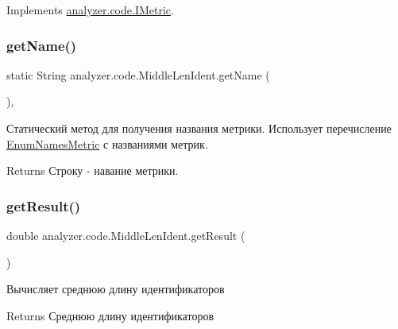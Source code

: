 Implements \hyperlink{interfaceanalyzer_1_1code_1_1IMetric}{analyzer.\+code.\+I\+Metric}.

\mbox{\label{classanalyzer_1_1code_1_1MiddleLenIdent_a4416bc43e60c97f489cccc3e6e9b67b1}} 
\subsubsection{\texorpdfstring{get\+Name()}{getName()}}
{\footnotesize\ttfamily static String analyzer.\+code.\+Middle\+Len\+Ident.\+get\+Name (\begin{DoxyParamCaption}{ }\end{DoxyParamCaption})\hspace{0.3cm}{\ttfamily [inline]}, {\ttfamily [static]}}

Статический метод для получения названия метрики. Использует перечисление \hyperlink{enumanalyzer_1_1code_1_1EnumNamesMetric}{Enum\+Names\+Metric} с названиями метрик. \begin{DoxyReturn}{Returns}
Строку -\/ навание метрики. 
\end{DoxyReturn}
\mbox{\label{classanalyzer_1_1code_1_1MiddleLenIdent_a46411e2d526efa424d894a7b5c950625}} 
\subsubsection{\texorpdfstring{get\+Result()}{getResult()}}
{\footnotesize\ttfamily double analyzer.\+code.\+Middle\+Len\+Ident.\+get\+Result (\begin{DoxyParamCaption}{ }\end{DoxyParamCaption})\hspace{0.3cm}{\ttfamily [inline]}}

Вычисляет среднюю длину идентификаторов \begin{DoxyReturn}{Returns}
Среднюю длину идентификаторов 
\end{DoxyReturn}


